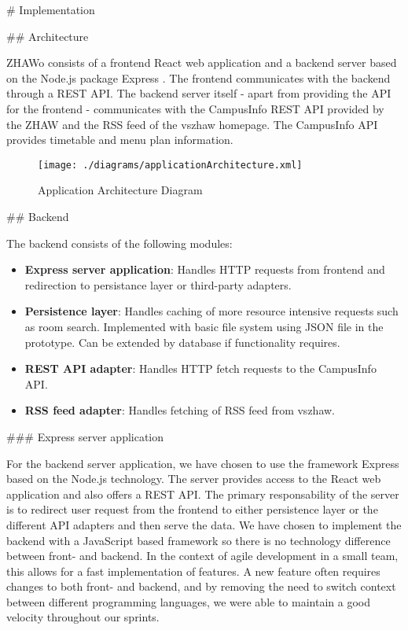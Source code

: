 \begin{markdown}

# Implementation

## Architecture

ZHAWo consists of a frontend React \cite{React} web application and a backend server based on the Node.js \cite{Node} package Express \cite{Express}. The frontend communicates with the backend through a REST API. The backend server itself - apart from providing the API for the frontend - communicates with the CampusInfo REST API provided by the ZHAW and the RSS feed of the vszhaw homepage. The CampusInfo API provides timetable and menu plan information.

\bigskip

\begin{figure}[H]
  \texttt{[image: ./diagrams/applicationArchitecture.xml]}
  \caption{Application Architecture Diagram}
\end{figure}

\bigskip

## Backend

The backend consists of the following modules:

\begin{itemize}
  \item \textbf{Express server application}: Handles HTTP requests from frontend and redirection to persistance layer or third-party adapters.
  \item \textbf{Persistence layer}: Handles caching of more resource intensive requests such as room search. Implemented with basic file system using JSON file in the prototype. Can be extended by database if functionality requires.
  \item \textbf{REST API adapter}: Handles HTTP fetch requests to the CampusInfo API.
  \item \textbf{RSS feed adapter}: Handles fetching of RSS feed from vszhaw.
\end{itemize}

### Express server application

For the backend server application, we have chosen to use the framework Express \cite{Express} based on the Node.js \cite{Node} technology. The server provides access to the React web application and also offers a REST API. The primary responsability of the server is to redirect user request from the frontend to either persistence layer or the different API adapters and then serve the data. We have chosen to implement the backend with a JavaScript based framework so there is no technology difference between front- and backend. In the context of agile development in a small team, this allows for a fast implementation of features. A new feature often requires changes to both front- and backend, and by removing the need to switch context between different programming languages, we were able to maintain a good velocity throughout our sprints.


\end{markdown}
